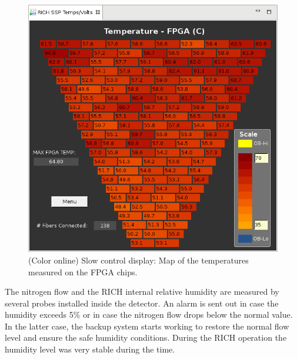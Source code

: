 \documentclass[5p,times,twocolumn]{elsarticle}
\begin{document}
\begin{figure}[t]
\begin{center}
\includegraphics[width=0.7\columnwidth]{FPGATempMap.png}
\end{center}
\caption{(Color online) Slow control display: Map of the temperatures measured on the FPGA chips.}
\label{fig:Online_FPGATempMap}
\end{figure}


The nitrogen flow and the RICH internal relative humidity are measured by several probes installed inside the detector.
An alarm is sent out in case the humidity exceeds 5\% or in case the nitrogen flow drops below the normal value. 
In the latter case, the backup system starts working to restore the normal flow level and ensure the safe humidity conditions. During the RICH operation the humidity level was very stable during the time.


\end{document}
